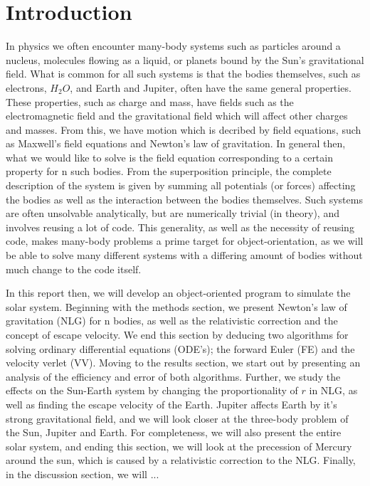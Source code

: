 \section{Introduction}
\label{sec:introduction}

In physics we often encounter many-body systems such as particles around a nucleus,
molecules flowing as a liquid, or planets bound by the Sun's gravitational field.
What is common for all such systems is that the bodies themselves, such as
electrons, $H_2 O$, and Earth and Jupiter, often have the same general properties.
These properties, such as charge and mass, have fields such as the electromagnetic field
and the gravitational field which will affect other charges and masses. From this,
we have motion which is decribed by field equations, such as Maxwell's field equations
and Newton's law of gravitation. In general then, what we would like to solve is
the field equation corresponding to a certain property for n such bodies. From
the superposition principle, the complete description of the system is given by
summing all potentials (or forces) affecting the bodies as well as the interaction
between the bodies themselves. Such systems are often unsolvable analytically, but are
numerically trivial (in theory), and involves reusing a lot of code. This generality,
as well as the necessity of reusing code, makes many-body problems a prime target
for object-orientation, as we will be able to solve many different systems with
a differing amount of bodies without much change to the code itself.

In this report then, we will develop an object-oriented program to simulate the
solar system. Beginning with the methods section, we present Newton's law of gravitation (NLG)
for n bodies, as well as the relativistic correction and the concept of escape velocity.
We end this section by deducing two algorithms for solving ordinary differential equations (ODE's);
the forward Euler (FE) and the velocity verlet (VV). Moving to the results section, we start out
by presenting an analysis of the efficiency and error of both algorithms. Further,
we study the effects on the Sun-Earth system by changing the proportionality of $r$ in NLG,
as well as finding the escape velocity of the Earth. Jupiter affects Earth by it's strong gravitational field,
and we will look closer at the three-body problem of the Sun, Jupiter and Earth. For completeness,
we will also present the entire solar system, and ending this section, we will
look at the precession of Mercury around the sun, which is caused by a relativistic correction
to the NLG. Finally, in the discussion section, we will ...

